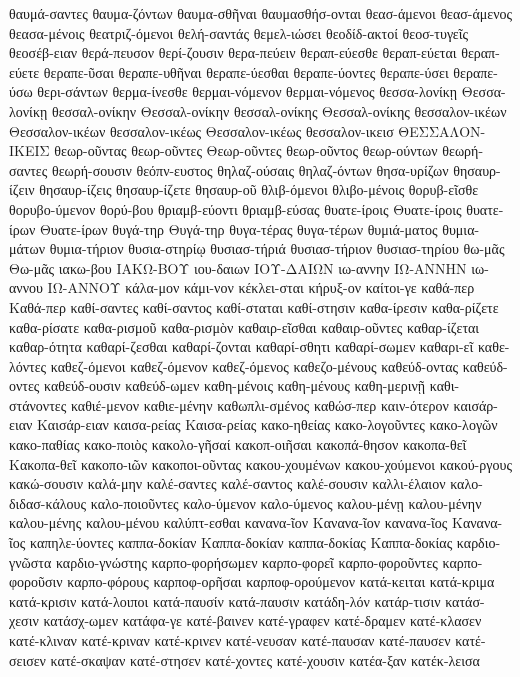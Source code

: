 {θαυμά-σαντες
θαυμα-ζόντων
θαυμα-σθῆναι
θαυμασθήσ-ονται
θεασ-άμενοι
θεασ-άμενος
θεασα-μένοις
θεατριζ-όμενοι
θελή-σαντάς
θεμελ-ιώσει
θεοδίδ-ακτοί
θεοσ-τυγεῖς
θεοσέβ-ειαν
θερά-πευσον
θερί-ζουσιν
θερα-πεύειν
θεραπ-εύεσθε
θεραπ-εύεται
θεραπ-εύετε
θεραπε-ῦσαι
θεραπε-υθῆναι
θεραπε-ύεσθαι
θεραπε-ύοντες
θεραπε-ύσει
θεραπε-ύσω
θερι-σάντων
θερμα-ίνεσθε
θερμαι-νόμενον
θερμαι-νόμενος
θεσσα-λονίκῃ
Θεσσα-λονίκῃ
θεσσαλ-ονίκην
Θεσσαλ-ονίκην
θεσσαλ-ονίκης
Θεσσαλ-ονίκης
θεσσαλον-ικέων
Θεσσαλον-ικέων
θεσσαλον-ικέως
Θεσσαλον-ικέως
θεσσαλον-ικεισ
ΘΕΣΣΑΛΟΝ-ΙΚΕΙΣ
θεωρ-οῦντας
θεωρ-οῦντες
Θεωρ-οῦντες
θεωρ-οῦντος
θεωρ-ούντων
θεωρή-σαντες
θεωρή-σουσιν
θεόπν-ευστος
θηλαζ-ούσαις
θηλαζ-όντων
θησα-υρίζων
θησαυρ-ίζειν
θησαυρ-ίζεις
θησαυρ-ίζετε
θησαυρ-οῦ
θλιβ-όμενοι
θλιβο-μένοις
θορυβ-εῖσθε
θορυβο-ύμενον
θορύ-βου
θριαμβ-εύοντι
θριαμβ-εύσας
θυατε-ίροις
Θυατε-ίροις
θυατε-ίρων
Θυατε-ίρων
θυγά-τηρ
Θυγά-τηρ
θυγα-τέρας
θυγα-τέρων
θυμιά-ματος
θυμια-μάτων
θυμια-τήριον
θυσια-στηρίῳ
θυσιασ-τήριά
θυσιασ-τήριον
θυσιασ-τηρίου
θω-μᾶς
Θω-μᾶς
ιακω-βου
ΙΑΚΩ-ΒΟΥ
ιου-δαιων
ΙΟΥ-ΔΑΙΩΝ
ιω-αννην
ΙΩ-ΑΝΝΗΝ
ιω-αννου
ΙΩ-ΑΝΝΟΥ
κάλα-μον
κάμι-νον
κέκλει-σται
κήρυξ-ον
καίτοι-γε
καθά-περ
Καθά-περ
καθί-σαντες
καθί-σαντος
καθί-σταται
καθί-στησιν
καθα-ίρεσιν
καθα-ρίζετε
καθα-ρίσατε
καθα-ρισμοῦ
καθα-ρισμὸν
καθαιρ-εῖσθαι
καθαιρ-οῦντες
καθαρ-ίζεται
καθαρ-ότητα
καθαρί-ζεσθαι
καθαρί-ζονται
καθαρί-σθητι
καθαρί-σωμεν
καθαρι-εῖ
καθε-λόντες
καθεζ-όμενοι
καθεζ-όμενον
καθεζ-όμενος
καθεζο-μένους
καθεύδ-οντας
καθεύδ-οντες
καθεύδ-ουσιν
καθεύδ-ωμεν
καθη-μένοις
καθη-μένους
καθη-μερινῇ
καθι-στάνοντες
καθιέ-μενον
καθιε-μένην
καθωπλι-σμένος
καθώσ-περ
καιν-ότερον
καισάρ-ειαν
Καισάρ-ειαν
καισα-ρείας
Καισα-ρείας
κακο-ηθείας
κακο-λογοῦντες
κακο-λογῶν
κακο-παθίας
κακο-ποιὸς
κακολο-γῆσαί
κακοπ-οιῆσαι
κακοπά-θησον
κακοπα-θεῖ
Κακοπα-θεῖ
κακοπο-ιῶν
κακοποι-οῦντας
κακου-χουμένων
κακου-χούμενοι
κακού-ργους
κακώ-σουσιν
καλά-μην
καλέ-σαντες
καλέ-σαντος
καλέ-σουσιν
καλλι-έλαιον
καλο-διδασ-κάλους
καλο-ποιοῦντες
καλο-ύμενον
καλο-ύμενος
καλου-μένῃ
καλου-μένην
καλου-μένης
καλου-μένου
καλύπτ-εσθαι
κανανα-ῖον
Κανανα-ῖον
κανανα-ῖος
Κανανα-ῖος
καπηλε-ύοντες
καππα-δοκίαν
Καππα-δοκίαν
καππα-δοκίας
Καππα-δοκίας
καρδιο-γνῶστα
καρδιο-γνώστης
καρπο-φορήσωμεν
καρπο-φορεῖ
καρπο-φοροῦντες
καρπο-φοροῦσιν
καρπο-φόρους
καρποφ-ορῆσαι
καρποφ-ορούμενον
κατά-κειται
κατά-κριμα
κατά-κρισιν
κατά-λοιποι
κατά-παυσίν
κατά-παυσιν
κατάδη-λόν
κατάρ-τισιν
κατάσ-χεσιν
κατάσχ-ωμεν
κατάφα-γε
κατέ-βαινεν
κατέ-γραφεν
κατέ-δραμεν
κατέ-κλασεν
κατέ-κλιναν
κατέ-κριναν
κατέ-κρινεν
κατέ-νευσαν
κατέ-παυσαν
κατέ-παυσεν
κατέ-σεισεν
κατέ-σκαψαν
κατέ-στησεν
κατέ-χοντες
κατέ-χουσιν
κατέα-ξαν
κατέκ-λεισα
}
